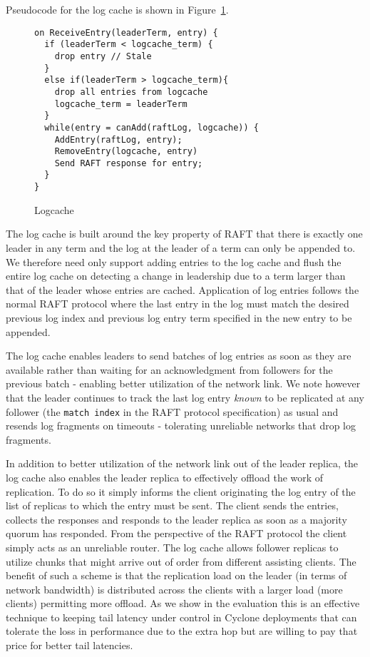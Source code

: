 \documentclass[twocolumn]{article}
\begin{document}
Pseudocode for the log cache is shown in Figure~\ref{fig:logcache}.

\begin{figure}
{ \scriptsize
\begin{verbatim}
on ReceiveEntry(leaderTerm, entry) {
  if (leaderTerm < logcache_term) {
    drop entry // Stale
  }
  else if(leaderTerm > logcache_term){
    drop all entries from logcache
    logcache_term = leaderTerm
  }
  while(entry = canAdd(raftLog, logcache)) {
    AddEntry(raftLog, entry);
    RemoveEntry(logcache, entry)
    Send RAFT response for entry;
  }
}
\end{verbatim}
}
\caption{Logcache}
\label{fig:logcache}
\end{figure}

The log cache is built around the key property of RAFT that there is exactly one
leader in any term and the log at the leader of a term can only be appended to. We
therefore need only support adding entries to the log cache and flush the entire
log cache on detecting a change in leadership due to a term larger than that of
the leader whose entries are cached. Application of log entries follows the
normal RAFT protocol where the last entry in the log must match the desired
previous log index and previous log entry term specified in the new entry to be
appended.

The log cache enables leaders to send batches of log entries as soon as they are
available rather than waiting for an acknowledgment from followers for the
previous batch - enabling better utilization of the network link. We note
however that the leader continues to track the last log entry \emph{known} to be
replicated at any follower (the {\tt match index} in the RAFT protocol
specification) as usual and resends log fragments on timeouts - tolerating
unreliable networks that drop log fragments.

In addition to better utilization of the network link out of the leader replica,
the log cache also enables the leader replica to effectively offload the work of
replication. To do so it simply informs the client originating the log entry of
the list of replicas to which the entry must be sent. The client sends the
entries, collects the responses and responds to the leader replica as soon as a
majority quorum has responded. From the perspective of the RAFT protocol the
client simply acts as an unreliable router. The log cache allows follower
replicas to utilize chunks that might arrive out of order from different
assisting clients. The benefit of such a scheme is that the replication load on
the leader (in terms of network bandwidth) is distributed across the clients
with a larger load (more clients) permitting more offload. As we show in the
evaluation this is an effective technique to keeping tail latency under control
in Cyclone deployments that can tolerate the loss in performance due to the
extra hop but are willing to pay that price for better tail latencies.
\end{document}
